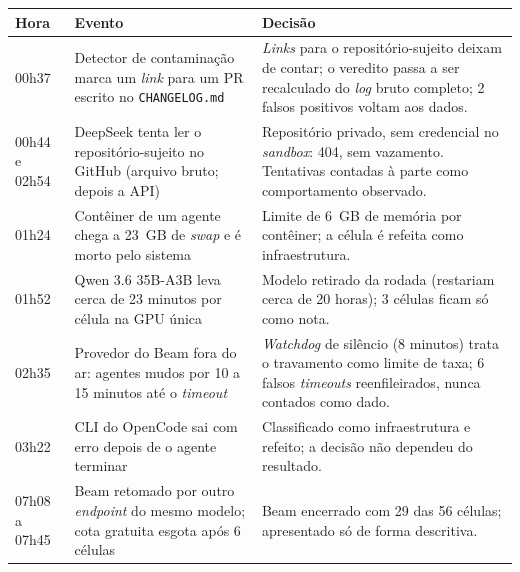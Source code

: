 \begin{quadro}[!htb]
    \centering
    \ABNTEXfontereduzida
    \caption{\label{qdr:incidentes}Incidentes da rodada reduzida (29 de outubro de 2026) e decisões tomadas}
    \begin{tabular}{|l|p{5.6cm}|p{6.9cm}|}
        \hline
        \textbf{Hora} & \textbf{Evento} & \textbf{Decisão} \\
        \hline
        00h37 & Detector de contaminação marca um \textit{link} para um PR escrito no \texttt{CHANGELOG.md} & \textit{Links} para o repositório-sujeito deixam de contar; o veredito passa a ser recalculado do \textit{log} bruto completo; 2 falsos positivos voltam aos dados. \\
        \hline
        00h44 e 02h54 & DeepSeek tenta ler o repositório-sujeito no GitHub (arquivo bruto; depois a API) & Repositório privado, sem credencial no \textit{sandbox}: 404, sem vazamento. Tentativas contadas à parte como comportamento observado. \\
        \hline
        01h24 & Contêiner de um agente chega a 23~GB de \textit{swap} e é morto pelo sistema & Limite de 6~GB de memória por contêiner; a célula é refeita como infraestrutura. \\
        \hline
        01h52 & Qwen 3.6 35B-A3B leva cerca de 23 minutos por célula na GPU única & Modelo retirado da rodada (restariam cerca de 20 horas); 3 células ficam só como nota. \\
        \hline
        02h35 & Provedor do Beam fora do ar: agentes mudos por 10 a 15 minutos até o \textit{timeout} & \textit{Watchdog} de silêncio (8 minutos) trata o travamento como limite de taxa; 6 falsos \textit{timeouts} reenfileirados, nunca contados como dado. \\
        \hline
        03h22 & CLI do OpenCode sai com erro depois de o agente terminar & Classificado como infraestrutura e refeito; a decisão não dependeu do resultado. \\
        \hline
        07h08 a 07h45 & Beam retomado por outro \textit{endpoint} do mesmo modelo; cota gratuita esgota após 6 células & Beam encerrado com 29 das 56 células; apresentado só de forma descritiva. \\
        \hline
    \end{tabular}
    \fonteautor
\end{quadro}
